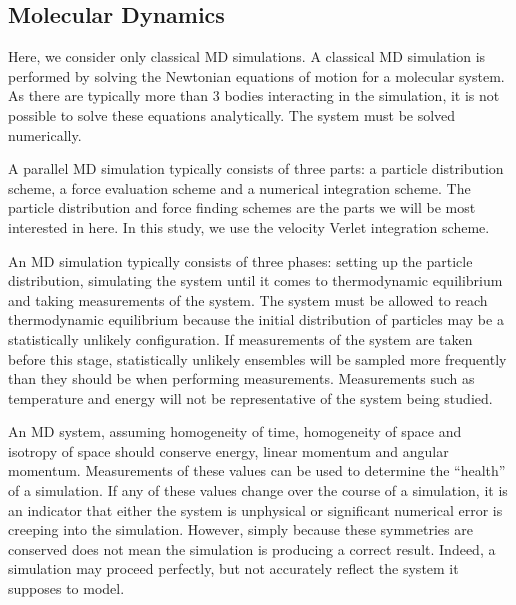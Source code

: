 %
%
\subsection{Molecular Dynamics}


Here, we consider only classical MD simulations.
%
A classical MD simulation is performed by
solving the Newtonian equations of motion for
a molecular system.
%
As there are typically more than 3 bodies interacting in the simulation,
it is not possible to solve these equations analytically.
%
The system must be solved numerically.


%
A parallel MD simulation typically consists of three parts:
a particle distribution scheme,
a force evaluation scheme and
a numerical integration scheme.
%
The particle distribution and force finding schemes are
the parts we will be most interested in here.
%
In this study, we use the velocity Verlet integration scheme.


%
An MD simulation typically consists of three phases:
setting up the particle distribution,
simulating the system until it comes to thermodynamic equilibrium and
taking measurements of the system.
%
The system must be allowed to reach thermodynamic equilibrium because
the initial distribution of particles may be a statistically unlikely
configuration.
%
If measurements of the system are taken before this stage, statistically
unlikely ensembles will be sampled more frequently than they should be when
performing measurements.
%
Measurements such as temperature and energy will not be representative
of the system being studied.



%
An MD system,
assuming homogeneity of time,
homogeneity of space and
isotropy of space
should conserve energy, linear momentum and angular momentum.
%
Measurements of these values can be used to
determine the ``health'' of a simulation.
%
If any of these values change over the course of a simulation,
it is an indicator that either the system is unphysical or
significant numerical error is creeping into the simulation.
%
However, simply because these symmetries are conserved does not mean
the simulation is producing a correct result.
%
Indeed, a simulation may proceed perfectly, but not accurately reflect
the system it supposes to model.




